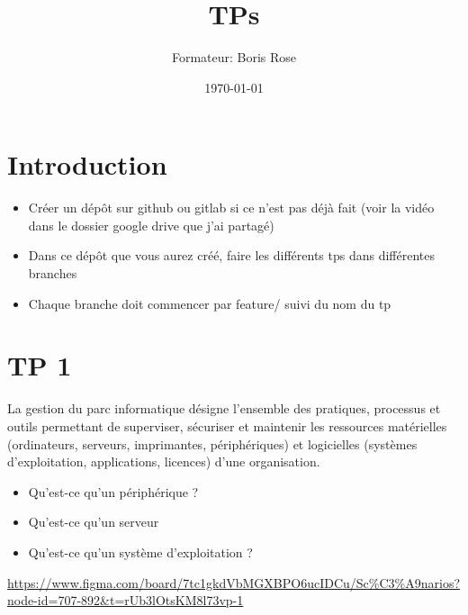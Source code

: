\documentclass[12pt, letterpaper]{article}
\title{TPs}
\author{Formateur: Boris Rose}
\date{\today}
\begin{document}
\maketitle

\section*{Introduction}

\begin{tcolorbox}[colback=brown!5,colframe=brown!60!black,title=Consignes]

\begin{itemize}
    \item Créer un dépôt sur github ou gitlab si ce n'est pas déjà fait (voir la vidéo dans le dossier google drive que j'ai partagé)
    \item Dans ce dépôt que vous aurez créé, faire les différents tps dans différentes branches
    \item Chaque branche doit commencer par feature/ suivi du nom du tp 
\end{itemize}


\end{tcolorbox}


\section*{TP 1}

\begin{tcolorbox}[colback=cyan!5,colframe=cyan!60!black,title=Définition]
La gestion du parc informatique désigne l’ensemble des pratiques, processus et outils permettant de superviser, sécuriser et maintenir les ressources matérielles (ordinateurs, serveurs, imprimantes, périphériques) et logicielles (systèmes d’exploitation, applications, licences) d’une organisation.
\end{tcolorbox}

\begin{itemize}
    \item Qu'est-ce qu'un périphérique ?
    \item Qu'est-ce qu'un serveur
    \item Qu'est-ce qu'un système d'exploitation ?
\end{itemize}


\begin{tcolorbox}[colback=cyan!5,colframe=cyan!60!black,title=Figma du Cours]
    \url{https://www.figma.com/board/7tc1gkdVbMGXBPO6ucIDCu/Sc%C3%A9narios?node-id=707-892&t=rUb3lOtsKM8l73vp-1}
\end{tcolorbox}
\end{document}
